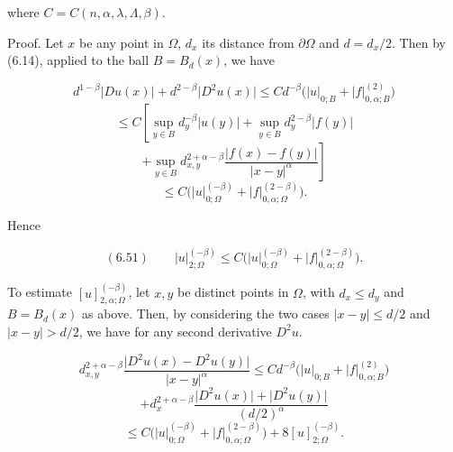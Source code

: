 where $C=C(n,\alpha,\lambda,\Lambda,\beta)$.


Proof. Let $x$ be any point in $\Omega$, $d_x$ its distance from $\partial\Omega$ and $d=d_x/2$. Then by
(6.14), applied to the ball $B=B_d(x)$, we have

\begin{equation*}
d^{1-\beta}\lvert Du(x)\rvert+d^{2-\beta}\lvert D^2u(x)\rvert\leq Cd^{-\beta}\bigl(\lvert u\rvert_{0;B}+\lvert f\rvert_{0,\alpha;B}^{(2)}\bigr)
\end{equation*}
\begin{equation*}
\leq C\left[\sup_{y\in B}d_y^{-\beta}\lvert u(y)\rvert+\sup_{y\in B}d_y^{2-\beta}\lvert f(y)\rvert\right.
\end{equation*}
\begin{equation*}
\left.+\sup_{y\in B}d_{x,y}^{2+\alpha-\beta}\frac{\lvert f(x)-f(y)\rvert}{\lvert x-y\rvert^{\alpha}}\right]
\end{equation*}
\begin{equation*}
\leq C\bigl(\lvert u\rvert_{0;\Omega}^{(-\beta)}+\lvert f\rvert_{0,\alpha;\Omega}^{(2-\beta)}\bigr).
\end{equation*}

Hence

\begin{equation}
(6.51)\qquad \lvert u\rvert_{2;\Omega}^{(-\beta)}\leq C\bigl(\lvert u\rvert_{0;\Omega}^{(-\beta)}+\lvert f\rvert_{0,\alpha;\Omega}^{(2-\beta)}\bigr).
\end{equation}

To estimate $[u]_{2,\alpha;\Omega}^{(-\beta)}$, let $x, y$ be distinct points in $\Omega$, with $d_x\leq d_y$ and
$B=B_d(x)$ as above. Then, by considering the two cases $\lvert x-y\rvert\leq d/2$ and $\lvert x-y\rvert>d/2$, we
have for any second derivative $D^2u$.

\begin{equation*}
d_{x,y}^{2+\alpha-\beta}\frac{\lvert D^2u(x)-D^2u(y)\rvert}{\lvert x-y\rvert^{\alpha}}
\leq Cd^{-\beta}\bigl(\lvert u\rvert_{0;B}+\lvert f\rvert_{0,\alpha;B}^{(2)}\bigr)
\end{equation*}
\begin{equation*}
+d_x^{2+\alpha-\beta}\frac{\lvert D^2u(x)\rvert+\lvert D^2u(y)\rvert}{(d/2)^{\alpha}}
\end{equation*}
\begin{equation*}
\leq C\bigl(\lvert u\rvert_{0;\Omega}^{(-\beta)}+\lvert f\rvert_{0,\alpha;\Omega}^{(2-\beta)}\bigr)+8[u]_{2;\Omega}^{(-\beta)}.
\end{equation*}

